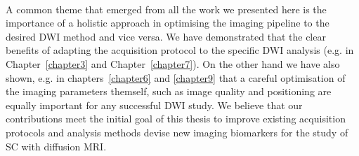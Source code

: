 \paragraph{}
A common theme that emerged from all the work we presented here is the importance of a holistic approach in optimising the imaging pipeline to the desired \gls{DWI} method and vice versa. We have demonstrated that the clear benefits of adapting the acquisition protocol to the specific \gls{DWI} analysis (e.g. in Chapter~\ref{chapter3} and Chapter~\ref{chapter7}). On the other hand we have also shown, e.g. in chapters~\ref{chapter6} and \ref{chapter9} that a careful optimisation of the imaging parameters themself, such as image quality and positioning are equally important for any successful \gls{DWI} study. We believe that our contributions meet the initial goal of this thesis to improve existing acquisition protocols and analysis methods devise new imaging biomarkers for the study of \gls{SC} with diffusion MRI.
% 
